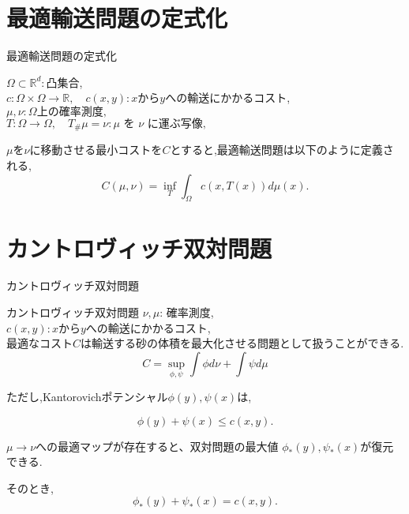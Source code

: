 \documentclass[dvipdfmx, 12pt]{beamer}
\begin{document}
\section{最適輸送問題の定式化}
\begin{frame}{最適輸送問題の定式化}
    \begin{block}{}
        $\Omega  \subset \mathbb{R}^d: \text{凸集合}$,\\
        $c: \Omega \times \Omega \to \mathbb{R}, \quad c(x, y) : x \text{から$y$への輸送にかかるコスト}$, \\
        $\mu, \nu : \Omega \text{上の確率測度},$\\
        $T: \Omega \to \Omega, \quad T_\#\mu = \nu: \text{$\mu$ を $\nu$ に運ぶ写像},$
        \vspace{\baselineskip} 

        $\mu$を$\nu$に移動させる最小コストを$C$とすると,最適輸送問題は以下のように定義される,
        \begin{equation*}
            C(\mu, \nu) = \inf_T \int_\Omega c(x, T(x)) d \mu (x).
        \end{equation*}

    \end{block}
\end{frame}

\section{カントロヴィッチ双対問題}
\begin{frame}{カントロヴィッチ双対問題}
    \begin{block}{カントロヴィッチ双対問題}
        $\nu, \mu$: 確率測度, \quad
        $c(x, y) : x \text{から$y$への輸送にかかるコスト}$,\\
        \vspace{\baselineskip} 
        最適なコスト$C$は輸送する砂の体積を最大化させる問題として扱うことができる.
        \begin{equation*}
            C = \sup_{\phi, \psi} \int \phi  d\nu + \int \psi  d\mu 
        \end{equation*}

        ただし,Kantorovichポテンシャル$\phi(y), \psi(x)$は, 
    
        \begin{equation*}
            \phi(y) + \psi(x) \le c(x, y).
        \end{equation*}
    \end{block}
    $\mu \to \nu$への最適マップが存在すると、双対問題の最大値 $\phi_*(y), \psi_*(x)$が復元できる.

    そのとき, 
    \begin{equation*}
        \phi_*(y) + \psi_*(x) = c(x, y).
    \end{equation*}

\end{frame}
\end{document}
